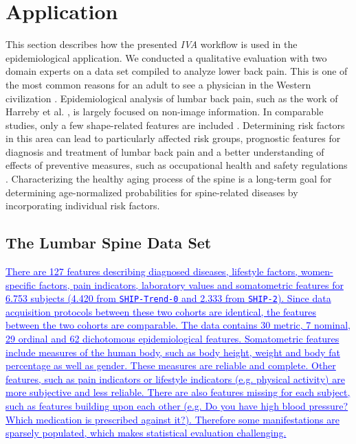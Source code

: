 \documentclass[journal]{style/vgtc} 			          %
\newcommand{\add}[1]{\textcolor{blue}{\uline{#1}}}
\begin{document}
\section{Application} \label{application}
This section describes how the presented \emph{IVA} workflow is used in the epidemiological application.
%
We conducted a qualitative evaluation with two domain experts on a data set compiled to analyze lower back pain. 
%
This is one of the most common reasons for an adult to see a physician in the Western civilization \cite{Backpain}.
%
Epidemiological analysis of lumbar back pain, such as the work of Harreby et al. \cite{Harreby1996}, is largely focused on non-image information.
%
In comparable studies, only a few shape-related features are included \cite{Lang2011}.
%
%
Determining risk factors in this area can lead to particularly affected risk groups, prognostic features for diagnosis and treatment of lumbar back pain and a better understanding of effects of preventive measures, such as occupational health and safety regulations \cite{Fletcher2012}.
%
Characterizing the healthy aging process of the spine is a long-term goal for determining age-normalized probabilities for spine-related diseases by incorporating individual risk factors.
%
\subsection{The Lumbar Spine Data Set}
%
\add{
There are 127 features describing diagnosed diseases, lifestyle factors, women-specific factors, pain indicators, laboratory values and somatometric features for 6.753 subjects (4.420 from \texttt{SHIP-Trend-0} and 2.333 from \texttt{SHIP-2}).
%
Since data acquisition protocols between these two cohorts are identical, the features between the two cohorts are comparable.
}
%
\add{The data contains 30 metric, 7 nominal, 29 ordinal and 62 dichotomous epidemiological features.
%
Somatometric features include measures of the human body, such as body height, weight and body fat percentage as well as gender.
%
These measures are reliable and complete.
%
Other features, such as pain indicators or lifestyle indicators (e.g. physical activity) are more subjective and less reliable.
%
There are also features missing for each subject, such as features building upon each other (e.g. Do you have high blood pressure? Which medication is prescribed against it?).
%
Therefore some manifestations are sparsely populated, which makes statistical evaluation challenging.
%
}
%
\end{document}
